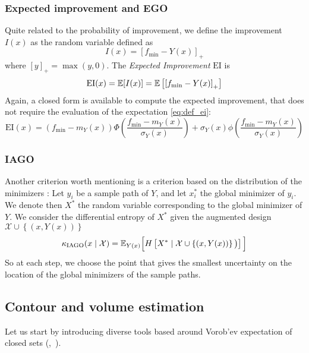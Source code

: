 \documentclass[../../Main_ManuscritThese.tex]{subfiles}
\begin{document}
\subsubsection{Expected improvement and EGO}
\cite{mockus_bayesian_1974}\cite{jones_efficient_1998}
Quite related to the probability of improvement, we define the improvement $I(x)$ as the random variable defined as
\begin{equation}
  \label{eq:def_improvement}
  I(x) = {\left[f_{\min} - Y(x)\right]}_+
\end{equation}
where $[y]_+ = \max(y, 0)$.
The \emph{Expected Improvement} $\mathrm{EI}$ is 
\begin{align}
  \label{eq:def_ei}
  \mathrm{EI}(x) = \mathbb{E}[I(x)]  = \mathbb{E}\left[\left[f_{\min} - Y(x) \right]_+\right]
\end{align}
Again, a closed form is available to compute the expected improvement, that does not require the evaluation of the expectation \cref{eq:def_ei}:
\begin{equation}
  \mathrm{EI}(x) = \left(f_{\min} - m_Y(x)\right) \Phi\left(\frac{f_{\min} - m_Y(x)}{\sigma_Y(x)}\right) + \sigma_Y(x) \phi\left(\frac{f_{\min} - m_Y(x)}{\sigma_Y(x)}\right)
\end{equation}

\subsubsection{IAGO}
\label{ssec:IAGO} Another criterion worth mentioning is a criterion based on the distribution of the minimizers \cite{villemonteix_informational_2006}:
Let $y_i$ be a sample path of $Y$, and let $x_i^*$ the global minimizer of $y_i$.
We denote then $X^*$ the random variable corresponding to the global minimizer of $Y$.
We consider the differential entropy of $X^*$ given the augmented design $\mathcal{X} \cup \left\{(x,Y(x))\right\}$
\begin{equation}
  \kappa_{\mathrm{IAGO}}(x \mid \mathcal{X})=\mathbb{E}_{Y(x)}\Big[H\left[X^* \mid \mathcal{X} \cup \left\{(x, Y(x))\right\} \big)\right]\Big]
\end{equation}
 So at each step, we choose the point that gives the smallest uncertainty on the location of the global minimizers of the sample paths.

\subsection{Contour and volume estimation}
Let us start by introducing diverse tools based around Vorob'ev expectation of closed sets (\cite{el_amri_analyse_2019},~\cite{heinrich_level_2012}). 
\end{document}

